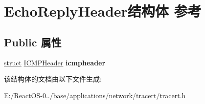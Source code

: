 \hypertarget{struct_echo_reply_header}{}\section{Echo\+Reply\+Header结构体 参考}
\label{struct_echo_reply_header}
\subsection*{Public 属性}
\begin{DoxyCompactItemize}
\item 
\mbox{\label{struct_echo_reply_header_ab21d5c2f66cb3816e80c9dcf4854168e}} 
\hyperlink{interfacestruct}{struct} \hyperlink{struct_i_c_m_p_header}{I\+C\+M\+P\+Header} {\bfseries icmpheader}
\end{DoxyCompactItemize}


该结构体的文档由以下文件生成\+:\begin{DoxyCompactItemize}
\item 
E\+:/\+React\+O\+S-\/0../base/applications/network/tracert/tracert.\+h\end{DoxyCompactItemize}
